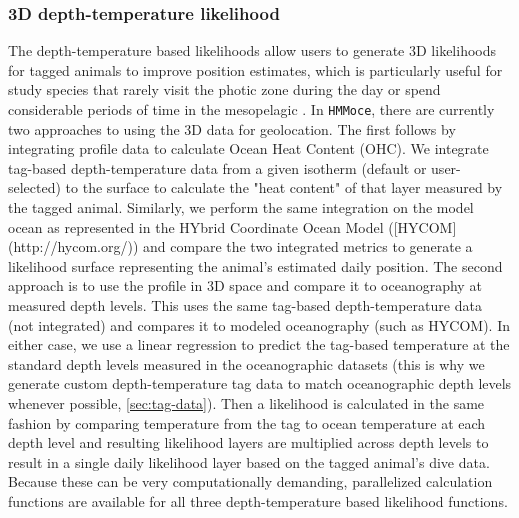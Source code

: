 \documentclass{article}\usepackage[]{graphicx}\usepackage[]{color}
\begin{document}
\subsubsection{3D depth-temperature likelihood}

The depth-temperature based likelihoods allow users to generate 3D likelihoods for tagged animals to improve position estimates, which is particularly useful for study species that rarely visit the photic zone during the day \citep[(e.g. swordfish,][]{Neilson2009, Braun2019} or spend considerable periods of time in the mesopelagic \citep[e.g. basking sharks,][]{Skomal2009, Braun2018b}. In \texttt{HMMoce}, there are currently two approaches to using the 3D data for geolocation. The first follows \citep{Luo2015} by integrating profile data to calculate Ocean Heat Content (OHC). We integrate tag-based depth-temperature data from a given isotherm (default or user-selected) to the surface to calculate the "heat content" of that layer measured by the tagged animal. Similarly, we perform the same integration on the model ocean as represented in the HYbrid Coordinate Ocean Model ([HYCOM](http://hycom.org/)) and compare the two integrated metrics to generate a likelihood surface representing the animal's estimated daily position. The second approach is to use the profile in 3D space and compare it to oceanography at measured depth levels. This uses the same tag-based depth-temperature data (not integrated) and compares it to modeled oceanography (such as HYCOM). In either case, we use a linear regression to predict the tag-based temperature at the standard depth levels measured in the oceanographic datasets (this is why we generate custom depth-temperature tag data to match oceanographic depth levels whenever possible, \ref{sec:tag-data}). Then a likelihood is calculated in the same fashion by comparing temperature from the tag to ocean temperature at each depth level and resulting likelihood layers are multiplied across depth levels to result in a single daily likelihood layer based on the tagged animal's dive data. Because these can be very computationally demanding, parallelized calculation functions are available for all three depth-temperature based likelihood functions.
\end{document}
